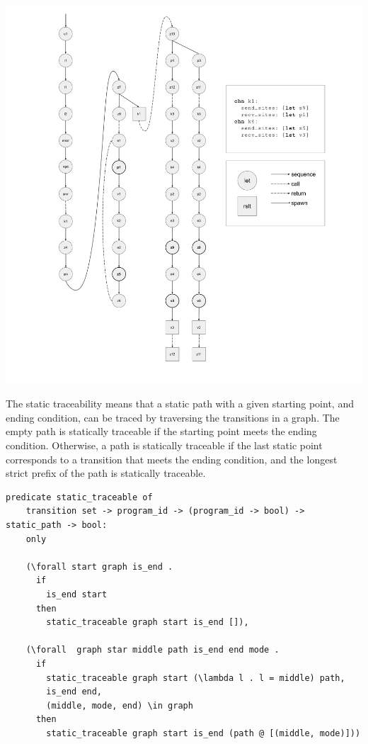 \documentclass{article}
\begin{document}
\includegraphics[width=1.3\textwidth, left]{cml_graph.pdf}

The static traceability means that a static path with a given starting point, and ending
condition, can be traced by traversing the transitions in a graph.
The empty path is statically traceable if the starting point meets the ending condition.
Otherwise, a path is statically traceable if the last static point corresponds to a transition
that meets the ending condition, and the longest strict prefix of the path is statically
traceable.  

\begin{lstlisting}[language=logic, mathescape]
  predicate static_traceable of
    transition set -> program_id -> (program_id -> bool) -> static_path -> bool:
    only

    (\forall start graph is_end .
      if
        is_end start
      then
        static_traceable graph start is_end []),

    (\forall  graph star middle path is_end end mode .
      if 
        static_traceable graph start (\lambda l . l = middle) path, 
        is_end end, 
        (middle, mode, end) \in graph 
      then
        static_traceable graph start is_end (path @ [(middle, mode)]))
  \end{lstlisting}
\end{document}
